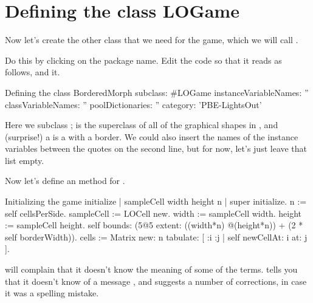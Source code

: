 \documentclass[a4paper,10pt,twoside]{book}
\begin{document}
\section{Defining the class LOGame}

Now let's create the other class that we need for the game, which we will call .

Do this by clicking on the package name.
Edit the code so that it reads as follows, and  it.

\begin{classdef}[sbegame]{Defining the  class}
BorderedMorph subclass: #LOGame
   instanceVariableNames: ''
   classVariableNames: ''
   poolDictionaries: ''
   category: 'PBE-LightsOut'
\end{classdef}

Here we subclass ;  is the superclass of all of the graphical shapes in \pharo, and (surprise!) a  is a  with a border.  
We could also insert the names of the instance variables between the quotes on the second line, but for now, let's just leave that list empty.

Now let's define an  method for .


\begin{numMethod}[sbegameinitialize]{Initializing the game}
initialize
   | sampleCell width height n |
   super initialize.
   n := self cellsPerSide.
   sampleCell := LOCell new.
   width := sampleCell width.
   height := sampleCell height.
   self bounds: (5@5 extent: ((width*n) @(height*n)) + (2 * self borderWidth)).
   cells := Matrix new: n tabulate: [ :i :j | self newCellAt: i at: j ].
\end{numMethod}


\pharo will complain that it doesn't know the meaning of some of the terms.
\pharo tells you that it doesn't know of a message , and suggests a number of corrections, in case it was a spelling mistake.
\end{document}
